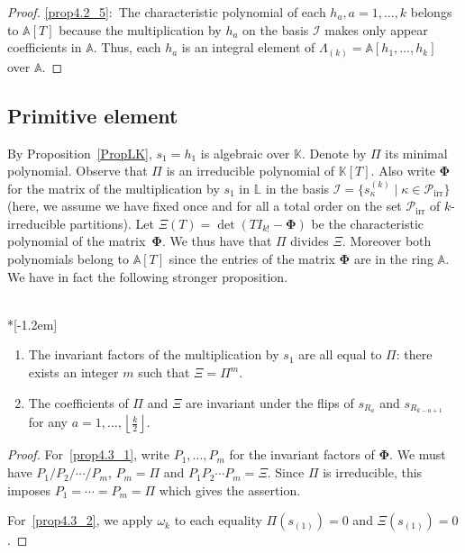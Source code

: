 \documentclass[ALCO,ThmDefs,Unicode,epreuves]{cedram}
\DeclareMathOperator{\irr}{irr}
\begin{document}
\begin{proof}
\eqref{prop4.2_5}:~The characteristic polynomial of each $h_{a},a=1,\ldots,k$ belongs to
$\mathbb{A}[T]$ because the multiplication by $h_{a}$ on the basis
$\mathcal{I}$ makes only appear coefficients in $\mathbb{A}$. Thus, each
$h_{a}$ is an integral element of $\Lambda_{(k)}=\mathbb{A}[h_{1},\ldots
,h_{k}]$ over $\mathbb{A}.$
\end{proof}

\subsection{Primitive element}

\label{subsec_primitiveel}By Proposition~\ref{PropLK}, $s_{1}=h_{1}$ is
algebraic over $\mathbb{K}$. Denote by $\Pi$ its minimal polynomial. Observe
that $\Pi$ is an irreducible polynomial of $\mathbb{K}[T]$. Also write
$\boldsymbol{\Phi}$ for the matrix of the multiplication by $s_{1}$ in
$\mathbb{L}$ in the basis $\mathcal{I}=\{s_{\kappa}^{(k)}\mid\kappa
\in\mathcal{P}_{\irr }\}$ (here, we assume we have fixed once and for all a
total order on the set $\mathcal{P}_{\irr }$ of $k$-irreducible
partitions). Let $\Xi(T)=\det (TI_{k!}-\boldsymbol{\Phi})$ be the
characteristic polynomial of the matrix~$\boldsymbol{\Phi}$. We thus have that
$\Pi$ divides $\Xi$. Moreover both polynomials belong to $\mathbb{A}[T]$ since
the entries of the matrix $\boldsymbol{\Phi}$ are in the ring $\mathbb{A}$. We
have in fact the following stronger proposition.

\begin{prop}\label{Prop_InvSim}\ \\*[-1.2em]

\begin{enumerate}
\item\label{prop4.3_1} The invariant factors of the multiplication by $s_{1}$ are all equal to
$\Pi$: there exists an integer $m$ such that $\Xi=\Pi^{m}.$

\item\label{prop4.3_2} The coefficients of $\Pi$ and $\Xi$ are invariant under the flips of
$s_{R_{a}}$ and $s_{R_{k-a+1}}$ for any $a=1,\ldots,\left\lfloor \frac{k}%
{2}\right\rfloor $.
\end{enumerate}
\end{prop}

\begin{proof}
For~\eqref{prop4.3_1}, write $P_{1},\ldots,P_{m}$ for the invariant factors of $\boldsymbol{\Phi}%
$. We must have $P_{1}/P_{2}/\cdots/P_{m}$, $P_{m}=\Pi$ and $P_{1}P_{2}\cdots
P_{m}=\Xi$. Since $\Pi$ is irreducible, this imposes $P_{1}=\cdots=P_{m}=\Pi$
which gives the assertion.

For~\eqref{prop4.3_2}, we apply $\omega_{k}$ to each equality $\Pi(s_{(1)})=0$ and $\Xi
(s_{(1)})=0$.
\end{proof}
\end{document}
